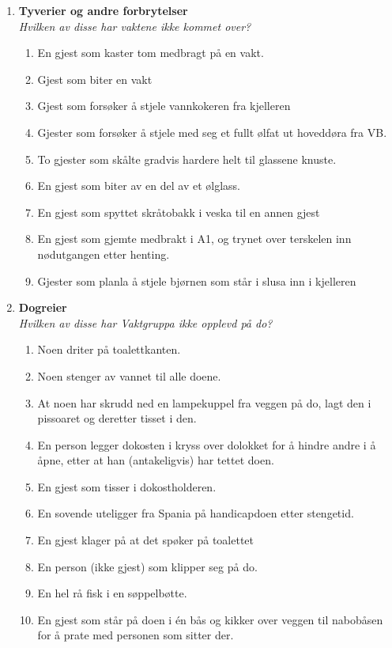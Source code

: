 \documentclass[11pt]{article}
\begin{document}
\begin{enumerate}
\newpage

\item \textbf{Tyverier og andre forbrytelser} \vspace{1mm} \\
\textit{Hvilken av disse har vaktene ikke kommet over?}
  \begin{enumerate}
        \item En gjest som kaster tom medbragt på en vakt.
        \item Gjest som biter en vakt
	\item Gjest som forsøker å stjele vannkokeren fra kjelleren
        \item Gjester som forsøker å stjele med seg et fullt ølfat ut hoveddøra fra VB.
        \item To gjester som skålte gradvis hardere helt til glassene knuste.
        \item En gjest som biter av en del av et ølglass.
        \item En gjest som spyttet skråtobakk i veska til en annen gjest
        \item En gjest som gjemte medbrakt i A1, og trynet over terskelen inn nødutgangen etter henting.
        \item Gjester som planla å stjele bjørnen som står i slusa inn i kjelleren
  \end{enumerate}

  

\item \textbf{Dogreier} \vspace{1mm} \\
\textit{Hvilken av disse har Vaktgruppa ikke opplevd på do?}
    \begin{enumerate}
        \item Noen driter på toalettkanten.
        \item Noen stenger av vannet til alle doene.
        \item At noen har skrudd ned en lampekuppel fra veggen på do, lagt den i pissoaret og deretter tisset i den.
        \item En person legger dokosten i kryss over dolokket for å hindre andre i å åpne, etter at han (antakeligvis) har tettet doen.
        \item En gjest som tisser i dokostholderen.
        \item En sovende uteligger fra Spania på handicapdoen etter stengetid.
        \item En gjest klager på at det spøker på toalettet
        \item En person (ikke gjest) som klipper seg på do.
        \item En hel rå fisk i en søppelbøtte.
        \item En gjest som står på doen i én bås og kikker over veggen til nabobåsen for å prate med personen som sitter der.
    \end{enumerate}


\end{enumerate}
\end{document}

